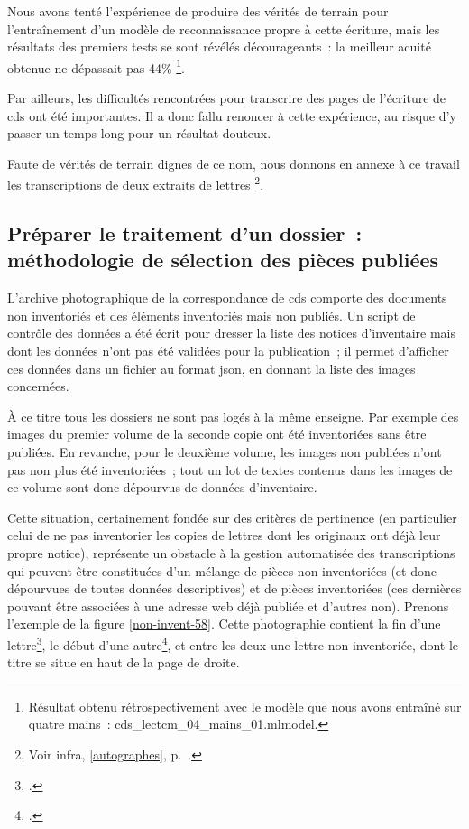 \documentclass[a4paper,12pt,twoside]{book}
\begin{document}
				Nous avons tenté l'expérience de produire des vérités de terrain pour l'entraînement d'un modèle de reconnaissance propre à cette écriture, mais les résultats des premiers tests se sont révélés décourageants~: la meilleur acuité obtenue ne dépassait pas 44\%
				\footnote{Résultat obtenu rétrospectivement avec le modèle que nous avons entraîné sur quatre mains~: cds\_lectcm\_04\_mains\_01.mlmodel.}.
				
				Par ailleurs, les difficultés rencontrées pour transcrire des pages de l'écriture de \gls{cds} ont été importantes. Il a donc fallu renoncer à cette expérience, au risque d'y passer un temps long pour un résultat douteux.
				
				Faute de vérités de terrain dignes de ce nom, nous donnons en annexe à ce travail les transcriptions de deux extraits de lettres
				\footnote{Voir infra, \ref{autographes}, p.~\pageref{autographes}.}.
		
			\subsection[Préparer le traitement d'un dossier]{Préparer le traitement d'un dossier~: méthodologie de sélection des pièces publiées}
				L'archive photographique de la correspondance de \gls{cds} comporte des documents non inventoriés et des éléments inventoriés mais non publiés. Un script de contrôle des données a été écrit pour dresser la liste des notices d'inventaire mais dont les données n'ont pas été validées pour la publication\cite{biayDonneesNonPublieesPy2022}~; il permet d'afficher ces données dans un fichier au format \gls{json}, en donnant la liste des images concernées.
				
				À ce titre tous les dossiers ne sont pas logés à la même enseigne. Par exemple des images du premier volume de la seconde copie\cite{CdS02001330} ont été inventoriées sans être publiées. En revanche, pour le deuxième volume\cite{CdS02001369}, les images non publiées n'ont pas non plus été inventoriées~; tout un lot de textes contenus dans les images de ce volume sont donc dépourvus de données d'inventaire. 
				
				Cette situation, certainement fondée sur des critères de pertinence (en particulier celui de ne pas inventorier les copies de lettres dont les originaux ont déjà leur propre notice), représente un obstacle à la gestion automatisée des transcriptions qui peuvent être constituées d'un mélange de pièces non inventoriées (et donc dépourvues de toutes données descriptives) et de pièces inventoriées (ces dernières pouvant être associées à une adresse web déjà publiée et d'autres non). Prenons l'exemple de la figure \ref{non-invent-58}. Cette photographie contient la fin d'une lettre\footcite{CdS02057058}, le début d'une autre\footcite{CdS02058059}, et entre les deux une lettre non inventoriée, dont le titre se situe en haut de la page de droite.
				
\end{document}
